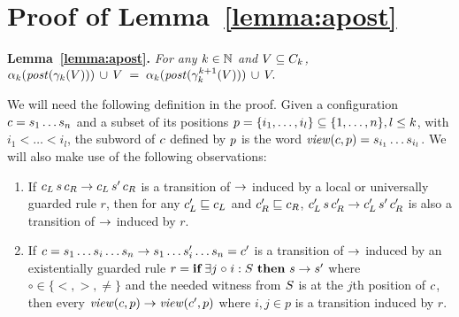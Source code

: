 \section{Proof of Lemma~\ref{lemma:apost}}
\label{proof:apost}

\noindent
{\bf Lemma~\ref{lemma:apost}.}
{\it
For any $k\in\nat$ and $\X\subseteq\viewsof k$,
$\projof {\postof {\gammaof k (\X)}} k\, \cup\, V\;  =\; \projof {\postof {\limgammaof k {k+1} (\X)}} k\, \cup\, V.$
\smallskip
}
%

\noindent
We will need the following definition in the proof.
%
Given a configuration $\conf = \loc_1\ldots\loc_n$
%
and a subset of its positions $\pos = \{i_1,\ldots, i_l\}\subseteq \{1,\ldots, n\},l\leq k$,
%
with $i_1<\ldots < i_l$, 
%
the subword of $\conf$ defined by $\pos$ is the word 
%
$\viewof \conf \pos = \loc_{i_1}\ldots \loc_{i_l}$.
%
We will also make use of the following observations:
\begin{enumerate}
\item
If $\conf_L\,\loc\,\conf_R\trans \conf_L\,\loc'\,\conf_R$ is a transition of $\trans$
%
induced by a local or universally guarded rule $r$, 
%
then for any $\conf_L'\subword\conf_L$ and $\conf_R'\subword\conf_R$, 
%
$\conf_L'\,\loc\,\conf_R'\trans \conf_L'\,\loc'\,\conf_R'$ 
%
is also a transition of $\trans$ induced by $r$.
\item
If $\conf = \loc_1\ldots\loc_i\ldots\loc_n\trans \loc_1\ldots\loc'_i\ldots\loc_n = \conf'$ 
%
is a transition of $\trans$ induced by an existentially guarded rule 
%
$r = \quantrule{\loc}{\loc'}{\exists}{\circ}{\L}$ where $\circ\in\{<,>,\neq\}$
%
and the needed witness from $\L$ is at the $j$th position of $\conf$, 
%
then every $\viewof \conf p \trans \viewof {\conf'} p$ where $i,j\in p$ is a transition induced by $r$.
\end{enumerate}



